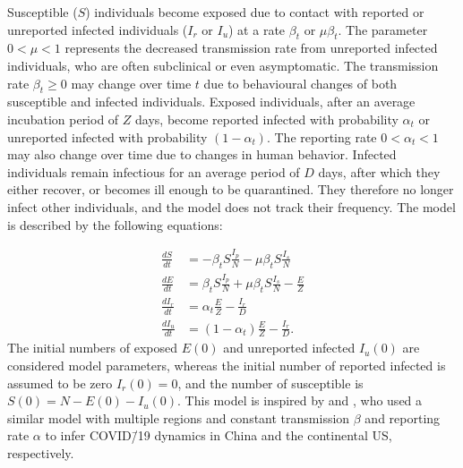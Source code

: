\documentclass[12pt]{extarticle}
\begin{document}
Susceptible ($S$) individuals become exposed due to contact with reported or unreported infected individuals ($I_r$ or $I_u$) at a rate $\beta_t$ or $\mu \beta_t$.
The parameter $0 < \mu < 1$ represents the decreased transmission rate from unreported infected individuals, who are often subclinical or even asymptomatic.
The transmission rate $\beta_t \ge 0$ may change over  time $t$ due to behavioural changes of both susceptible and infected individuals.
Exposed individuals, after an average incubation period of $Z$ days, become reported infected with probability $\alpha_t$ or unreported infected with probability $(1-\alpha_t)$.
The reporting rate $0 < \alpha_t < 1$ may also change over time due to changes in human behavior.
Infected individuals remain infectious for an average period of $D$ days, after which they either recover, or becomes ill enough to be quarantined.
They therefore no longer infect other individuals, and the model does not track their frequency.
The model is described by the following equations:

\begin{equation} \label{eq:model}
\begin{aligned}
\frac{dS}{dt} & = -\beta_t S \frac{I_p}{N} - \mu \beta_t S \frac{I_s}{N} \\
\frac{dE}{dt} & = \beta_t S \frac{I_p}{N} + \mu \beta_t S \frac{I_s}{N}  - \frac{E}{Z} \\
\frac{dI_r}{dt} & = \alpha_t \frac{E}{Z} - \frac{I_r}{D} \\
\frac{dI_u}{dt} & = (1-\alpha_t) \frac{E}{Z} - \frac{I_r}{D} .
\end{aligned}
\end{equation}
The initial numbers of exposed $E(0)$ and unreported infected $I_u(0)$ are considered model parameters, whereas the initial number of reported infected is assumed to be zero $I_r(0)=0$, and the number of susceptible is $S(0)=N-E(0)-I_u(0)$.
This model is inspired by \citet{Li2020} and \citet{Pei2020}, who used a similar model with multiple regions and constant transmission $\beta$ and reporting rate $\alpha$ to infer COVID\=/19 dynamics in China and the continental US, respectively.



\end{document}
